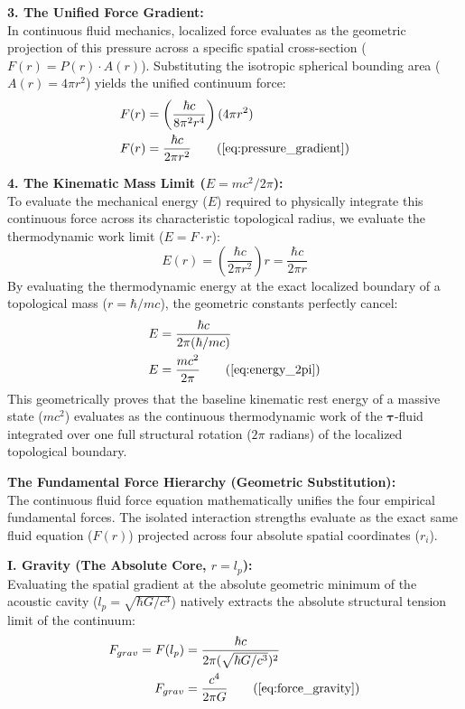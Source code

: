 \documentclass[11pt, a4paper]{article}
\begin{document}
\textbf{3. The Unified Force Gradient:} \\
In continuous fluid mechanics, localized force evaluates as the geometric projection of this pressure across a specific spatial cross-section ($F(r) = P(r) \cdot A(r)$). Substituting the isotropic spherical bounding area ($A(r) = 4\pi r^2$) yields the unified continuum force:
\begin{align}
    F(r) &= \left( \frac{\hbar c}{8\pi^2 r^4} \right) (4\pi r^2) \nonumber \\
    F(r) &= \frac{\hbar c}{2\pi r^2} \tag{\ref{eq:pressure_gradient}}
\end{align}

\textbf{4. The Kinematic Mass Limit ($E = mc^2/2\pi$):} \\
To evaluate the mechanical energy ($E$) required to physically integrate this continuous force across its characteristic topological radius, we evaluate the thermodynamic work limit ($E = F \cdot r$):
\begin{equation}
    E(r) = \left( \frac{\hbar c}{2\pi r^2} \right) r = \frac{\hbar c}{2\pi r} 
\end{equation}
By evaluating the thermodynamic energy at the exact localized boundary of a topological mass ($r = \hbar/mc$), the geometric constants perfectly cancel:
\begin{align}
    E &= \frac{\hbar c}{2\pi (\hbar / mc)} \nonumber \\
    E &= \frac{m c^2}{2\pi} \tag{\ref{eq:energy_2pi}}
\end{align}
This geometrically proves that the baseline kinematic rest energy of a massive state ($mc^2$) evaluates as the continuous thermodynamic work of the $\boldsymbol{\tau}$-fluid integrated over one full structural rotation ($2\pi$ radians) of the localized topological boundary.

\textbf{The Fundamental Force Hierarchy (Geometric Substitution):} \\
The continuous fluid force equation mathematically unifies the four empirical fundamental forces. The isolated interaction strengths evaluate as the exact same fluid equation ($F(r)$) projected across four absolute spatial coordinates ($r_i$).

\textbf{I. Gravity (The Absolute Core, $r = l_p$):} \\
Evaluating the spatial gradient at the absolute geometric minimum of the acoustic cavity ($l_p = \sqrt{\hbar G / c^3}$) natively extracts the absolute structural tension limit of the continuum:
\begin{align}
    F_{grav} = F(l_p) &= \frac{\hbar c}{2\pi (\sqrt{\hbar G / c^3})^2} \nonumber \\
    F_{grav} &= \frac{c^4}{2\pi G} \tag{\ref{eq:force_gravity}}
\end{align}
\end{document}

